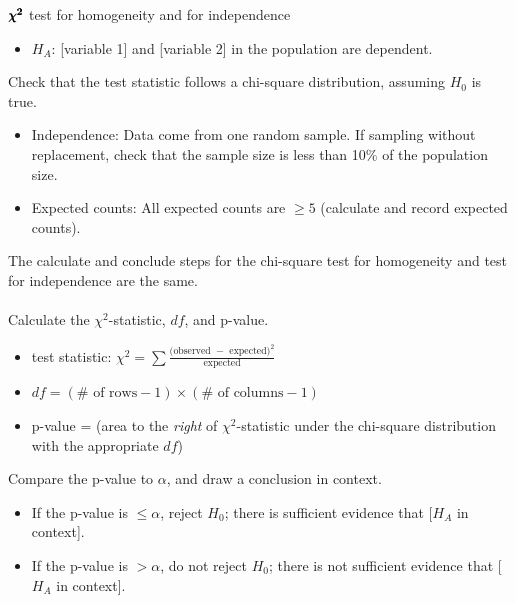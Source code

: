 \begin{onebox}{$\pmb{\MakeLowercase{\chi^2}}$ test for homogeneity and for independence}
\begin{itemize}
\item[] $H_A$: [variable 1] and [variable 2] in the population are dependent.
\end{itemize}
 Check that the test statistic follows a chi-square distribution, assuming $H_0$ is true.\vspace{-1mm}
{\setlength{\leftmargini}{13mm}
\begin{itemize}
\setlength{\itemsep}{0mm}
\item[1.]  Independence:  Data come from one random sample.  If sampling without replacement, 
check that the sample size is less than 10\% of the population size.
\item[2.] Expected counts:  All expected counts are $\ge 5$ (calculate and record expected counts).
\end{itemize}
}
\vspace{2mm}
The calculate and conclude steps for the chi-square test for homogeneity and test for independence are the same.\\
\\
 Calculate the $\chi^2$-statistic, $df$, and p-value.\vspace{-1mm}  
\begin{itemize}
\setlength{\itemsep}{0mm}
\item[] test statistic:  $\chi^2 =\sum{ \frac{\text{(observed } - \text{ expected})^2}{\text{expected}}}$ 
\item[] $df = (\# \text{ of rows} - 1) \times (\# \text{ of columns} - 1)$
\item[] p-value = (area to the \emph{right} of $\chi^2$-statistic under the chi-square distribution with the appropriate $df$)
\end{itemize}
 Compare the p-value to $\alpha$, and draw a conclusion in context.
\begin{itemize}\vspace{-1mm}
\setlength{\itemsep}{0mm}
\item[] If the p-value is $\le \alpha$, reject $H_0$; there is sufficient evidence that [$H_A$ in context]. 
\item[] If the p-value is $> \alpha$, do not reject $H_0$; there is not sufficient evidence that [$H_A$ in context].
\end{itemize}\end{onebox}

